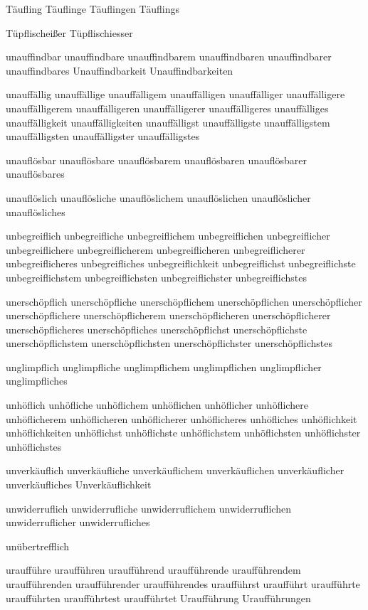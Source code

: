 Täufling Täuflinge Täuflingen Täuflings

Tüpflischeißer Tüpflischiesser

unauffindbar unauffindbare unauffindbarem unauffindbaren unauffindbarer unauffindbares Unauffindbarkeit Unauffindbarkeiten

unauffällig unauffällige unauffälligem unauffälligen unauffälliger unauffälligere unauffälligerem unauffälligeren unauffälligerer unauffälligeres unauffälliges unauffälligkeit unauffälligkeiten unauffälligst unauffälligste unauffälligstem unauffälligsten unauffälligster unauffälligstes

unauflösbar unauflösbare unauflösbarem unauflösbaren unauflösbarer unauflösbares

unauflöslich unauflösliche unauflöslichem unauflöslichen unauflöslicher unauflösliches

unbegreiflich unbegreifliche unbegreiflichem unbegreiflichen unbegreiflicher unbegreiflichere unbegreiflicherem unbegreiflicheren unbegreiflicherer unbegreiflicheres unbegreifliches unbegreiflichkeit unbegreiflichst unbegreiflichste unbegreiflichstem unbegreiflichsten unbegreiflichster unbegreiflichstes

unerschöpflich unerschöpfliche unerschöpflichem unerschöpflichen unerschöpflicher unerschöpflichere unerschöpflicherem unerschöpflicheren unerschöpflicherer unerschöpflicheres unerschöpfliches unerschöpflichst unerschöpflichste unerschöpflichstem unerschöpflichsten unerschöpflichster unerschöpflichstes

unglimpflich unglimpfliche unglimpflichem unglimpflichen unglimpflicher unglimpfliches

unhöflich unhöfliche unhöflichem unhöflichen unhöflicher unhöflichere unhöflicherem unhöflicheren unhöflicherer unhöflicheres unhöfliches unhöflichkeit unhöflichkeiten unhöflichst unhöflichste unhöflichstem unhöflichsten unhöflichster unhöflichstes

unverkäuflich unverkäufliche unverkäuflichem unverkäuflichen unverkäuflicher unverkäufliches Unverkäuflichkeit

unwiderruflich unwiderrufliche unwiderruflichem unwiderruflichen unwiderruflicher unwiderrufliches

unübertrefflich

uraufführe uraufführen uraufführend uraufführende uraufführendem uraufführenden uraufführender uraufführendes uraufführst uraufführt uraufführte uraufführten uraufführtest uraufführtet Uraufführung Uraufführungen

